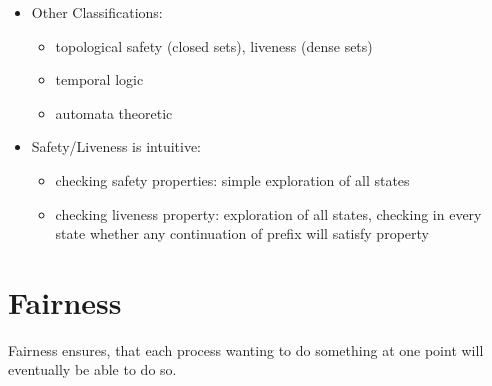 \documentclass[a4paper, 10pt]{article}
\begin{document}
\begin{itemize}
\begin{itemize}
        \vspace*{-4em} {\tiny Note: for every finite property $\Phi: E(\Phi)=\Phi\cdot\Sigma^\omega$}
    \end{itemize}
    \item Other Classifications:
    \begin{itemize}
        \item topological \follows safety (closed sets), liveness (dense sets)
        \item temporal logic
        \item automata theoretic
    \end{itemize}
    \item Safety/Liveness is intuitive:
    \begin{itemize}
        \item checking safety properties: simple exploration of all states
        \item checking liveness property: exploration of all states, checking in every state whether any continuation of prefix will satisfy property
    \end{itemize}
\end{itemize}

\section*{Fairness}
Fairness ensures, that each process wanting to do something at one point will eventually be able to do so.
\end{document}
